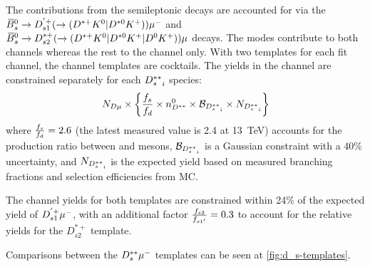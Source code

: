 The contributions from the semileptonic \Bsb decays are accounted for via
the ${{\kern 0.18em\overline{\kern -0.18em B}}{}^0_{s}} \rightarrow D_{s1}^{'+} (\rightarrow ({{D}^{*+}}{{K}^0}|{{D}^{*0}}{{K}^+})){\mu^-}$ and
${{\kern 0.18em\overline{\kern -0.18em B}}{}^0_{s}} \rightarrow D_{s2}^{*+} (\rightarrow ({{D}^{*+}}{{K}^0}|{{D}^{*0}}{{K}^+}|{{D}^0}{{K}^+}))\mu$
decays.
The \Dstarp\Kz\mun modes contribute to both channels whereas the
rest to the \Dz channel only.
With two templates for each fit channel,
the \Dz channel templates are cocktails.
The yields in the \Dz channel are constrained separately for each
${D_s^{**}}_i$ species:
\begin{equation}
    N_{D\mu} \times \left\{
        \frac{f_s}{f_d} \times n^{0}_{D^{**}} \times \mathcal{B}_{{D_s^{**}}_i} \times
        N_{{D_s^{**}}_i}
    \right\}
\end{equation}
where $\frac{f_s}{f_d} = 2.6$ (the latest measured value is 2.4 at 13~TeV) accounts for
the production ratio between \Bzb and \Bsb mesons,
$\mathcal{B}_{{D_s^{**}}_i}$ is a Gaussian constraint with a 40\% uncertainty,
and $N_{{D_s^{**}}_i}$ is the expected yield based on measured branching fractions
and selection efficiencies from MC.

The \Dstar channel yields for both templates are constrained within 24\%
of the expected yield of $D_{s1}^{'+}{\mu^-}$,
with an additional factor $\frac{f_{s2}}{f_{s1'}} = 0.3$ to account for the relative
yields for the $D_{s2}^{*+}$ template.

Comparisons between the $D_s^{**}{\mu^-}$ templates can be seen at
\cref{fig:d_s-templates}.

